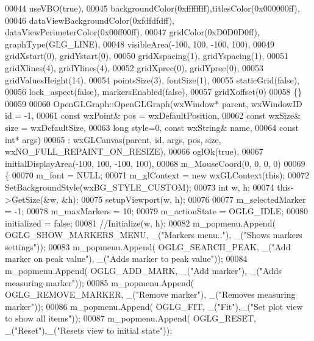 \begin{DoxyCode}
00044     useVBO(true),
00045     backgroundColor(0xffffffff),titlesColor(0x000000ff),
00046     dataViewBackgroundColor(0xfdfdfdff), dataViewPerimeterColor(0x00ff00ff),
00047     gridColor(0xD0D0D0ff), graphType(GLG_LINE),
00048     visibleArea(-100, 100, -100, 100),
00049     gridXstart(0), gridYstart(0),
00050     gridXspacing(1), gridYspacing(1),
00051     gridXlines(4), gridYlines(4),
00052     gridXprec(0), gridYprec(0),
00053     gridValuesHeight(14),
00054     pointsSize(3), fontSize(1),
00055     staticGrid(false),
00056     lock\_aspect(false), markersEnabled(false),
00057     gridXoffset(0)
00058     \{\}
00059 
00060 OpenGLGraph::OpenGLGraph(wxWindow* parent,  wxWindowID \textcolor{keywordtype}{id} = -1,
00061                     \textcolor{keyword}{const} wxPoint& pos = wxDefaultPosition,
00062                     \textcolor{keyword}{const} wxSize& size = wxDefaultSize,
00063                     \textcolor{keywordtype}{long} style=0, \textcolor{keyword}{const} wxString& name,
00064                     \textcolor{keyword}{const} \textcolor{keywordtype}{int}* args)
00065     : wxGLCanvas(parent, id, args, pos, size, wxNO\_FULL\_REPAINT\_ON\_RESIZE),
00066 oglOk(true),
00067 initialDisplayArea(-100, 100, -100, 100),
00068 m\_MouseCoord(0, 0, 0, 0)
00069 \{
00070     m_font = NULL;
00071     m_glContext = \textcolor{keyword}{new} wxGLContext(\textcolor{keyword}{this});
00072     SetBackgroundStyle(wxBG\_STYLE\_CUSTOM);
00073     \textcolor{keywordtype}{int} w, h;
00074     this->GetSize(&w, &h);
00075     setupViewport(w, h);
00076 
00077     m_selectedMarker = -1;
00078     m_maxMarkers = 10;
00079     m_actionState = OGLG_IDLE;
00080     initialized = \textcolor{keyword}{false};
00081     \textcolor{comment}{//Initialize(w, h);}
00082     m_popmenu.Append( OGLG_SHOW_MARKERS_MENU, \_(\textcolor{stringliteral}{"Markers menu.."}), \_(\textcolor{stringliteral}{"Shows markers settings"}));
00083     m_popmenu.Append( OGLG_SEARCH_PEAK, \_(\textcolor{stringliteral}{"Add marker on peak value"}), \_(\textcolor{stringliteral}{"Adds marker to peak value"}));
00084     m_popmenu.Append( OGLG_ADD_MARK, \_(\textcolor{stringliteral}{"Add marker"}), \_(\textcolor{stringliteral}{"Adds measuring marker"}));
00085     m_popmenu.Append( OGLG_REMOVE_MARKER, \_(\textcolor{stringliteral}{"Remove marker"}), \_(\textcolor{stringliteral}{"Removes measuring marker"}));
00086     m_popmenu.Append( OGLG_FIT, \_(\textcolor{stringliteral}{"Fit"}),\_(\textcolor{stringliteral}{"Set plot view to show all items"}));
00087     m_popmenu.Append( OGLG_RESET, \_(\textcolor{stringliteral}{"Reset"}),\_(\textcolor{stringliteral}{"Resets view to initial state"}));

\end{DoxyCode}
